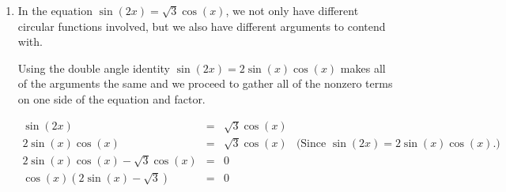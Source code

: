 \documentclass{ximera}
\begin{document}
\begin{example}
\begin{explanation}
\begin{enumerate}
 

From $\cos(3x) = \cos(5x)$, we get $\cos(5x) - \cos(3x) = 0$, and it is the presence of $0$ on the right hand side that indicates a switch to a product would be a good move.\footnote{Since a \textit{product} equalling zero means, necessarily, one or both \textit{factors} is $0$.  See page \ref{propertiesofzero}.}

 

 Using Theorem \ref{sumtoproduct}, we rewrite $\cos(5x) - \cos(3x)$  as $- 2 \sin\left( \frac{5x + 3x}{2}\right)\sin\left( \frac{5x - 3x}{2}\right) = -2 \sin(4x)\sin(x)$.  Hence, our original equation $\cos(3x) = \cos(5x)$ is equivalent to $-2 \sin(4x) \sin(x) = 0$.  
 
  
 
From $-2 \sin(4x) \sin(x) = 0$, we get either  $\sin(4x) = 0$ or $\sin(x)$ = 0. Solving $\sin(4x) = 0$ gives $x = \frac{\pi}{4} k$ for integers $k$, and the solution to $\sin(x) = 0$ is $x = \pi k$ for integers $k$.  

 

The second set of solutions is contained in the first set of solutions,\footnote{As always, when in doubt, write it out!} so our final solution to $\cos(5x) = \cos(3x)$ is $x = \frac{\pi}{4} k$ for integers $k$.  

 

There are eight of these answers which lie in $[0,2\pi)$:  $x = 0$, $\frac{\pi}{4}$, $\frac{\pi}{2}$, $\frac{3\pi}{4}$, $\pi$, $\frac{5\pi}{4}$, $\frac{3\pi}{2}$ and $\frac{7\pi}{4}$.  Our plot of the graphs of $y = \cos(3x)$ and $y = \cos(5x)$ below bears this out. 

\begin{center}
\end{center}

\item  In the equation   $\sin(2x) =\sqrt{3} \cos(x)$, we not only  have different circular functions involved,  but we also have different arguments to contend with.  

 

Using the double angle identity $\sin(2x) = 2 \sin(x) \cos(x)$ makes all of the arguments the same and we proceed to gather all of the nonzero terms on one side of the equation and factor.

\[ \begin{array}{rclr}

\sin(2x) & = & \sqrt{3} \cos(x) & \\
2 \sin(x) \cos(x) & = & \sqrt{3} \cos(x)  & \text{(Since $\sin(2x) = 2\sin(x) \cos(x)$.)} \\
2\sin(x) \cos(x) - \sqrt{3} \cos(x) & = & 0 & \\
\cos(x) (2 \sin(x) - \sqrt{3}) & = & 0 & \\ \end{array} \]


\end{enumerate}
\end{explanation}
\end{example}
\end{document}
